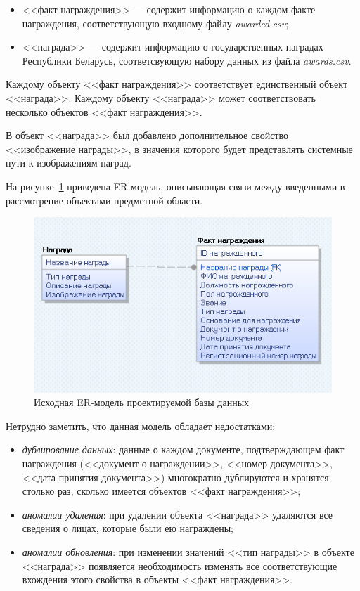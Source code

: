 \begin{itemize}
  \item <<факт награждения>> --- содержит информацию о каждом факте награждения,
    соответствующую входному файлу \textit{awarded.csv};
  \item <<награда>> --- содержит информацию о государственных наградах
    Республики Беларусь, соответсвующую набору данных из файла \textit{awards.csv}.
\end{itemize}

Каждому объекту <<факт награждения>> соответствует единственный
объект <<награда>>.
Каждому объекту <<награда>> может соответствовать несколько объектов
<<факт награждения>>.

В объект <<награда>> был добавлено дополнительное свойство <<изображение награды>>,
в значения которого будет представлять системные пути к изображениям наград.

На рисунке~\ref{fig:er_naive} приведена ER-модель, описывающая связи между 
введенными в рассмотрение объектами предметной области.

\begin{figure}[h]
  \centering
  \includegraphics[width=120mm]{pic/er_naive.png}
  \caption{Исходная ER-модель проектируемой базы данных}
  \label{fig:er_naive}
\end{figure}

Нетрудно заметить, что данная модель обладает недостатками:
\begin{itemize}
\item
  \textit{дублирование данных}: данные о каждом документе,
  подтверждающем факт награждения
  (<<документ о награждении>>, <<номер документа>>, 
  <<дата принятия документа>>) многократно дублируются и хранятся столько раз,
  сколько имеется объектов <<факт награждения>>;
\item
  \textit{аномалии удаления}: при удалении объекта <<награда>> удаляются все сведения
  о лицах, которые были ею награждены;
\item
  \textit{аномалии обновления}: при изменении значений <<тип награды>> в объекте
  <<награда>> появляется необходимость изменять все соответствующие вхождения этого свойства в
  объекты <<факт награждения>>.
\end{itemize}

